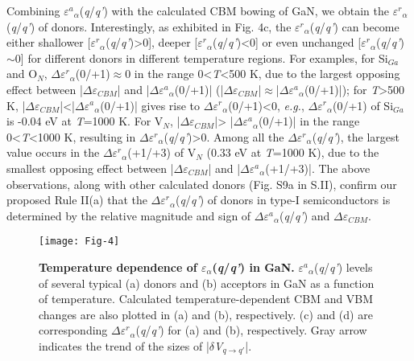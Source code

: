 \documentclass[onecolumn,preprint,superscriptaddress]{revtex4-1}
\begin{document}
Combining $\varepsilon$$^{a}$$_{\alpha}$(\emph{q}/\emph{q'}) with the calculated CBM bowing of GaN, we obtain the $\varepsilon$$^{r}$$_{\alpha}$(\emph{q}/\emph{q'}) of donors. Interestingly, as exhibited in Fig. 4c, the $\varepsilon$$^{r}$$_{\alpha}$(\emph{q}/\emph{q'}) can become either shallower [$\varepsilon$$^{r}$$_{\alpha}$(\emph{q}/\emph{q'})>0], deeper [$\varepsilon$$^{r}$$_{\alpha}$(\emph{q}/\emph{q'})<0] or even unchanged [$\varepsilon$$^{r}$$_{\alpha}$(\emph{q}/\emph{q'})$\sim$0] for different donors in different temperature regions. For examples, for Si$_{Ga}$ and O$_N$, $\Delta$$\varepsilon$$^{r}$$_{\alpha}$(0/+1)$\approx$0 in the range 0<\emph{T}<500 K, due to the largest opposing effect between |$\Delta$$\varepsilon$$_{CBM}$| and |$\Delta$$\varepsilon$$^{a}$$_{\alpha}$(0/+1)| (|$\Delta$$\varepsilon$$_{CBM}$|$\approx$|$\Delta$$\varepsilon$$^{a}$$_{\alpha}$(0/+1)|); for \emph{T}>500 K, |$\Delta$$\varepsilon$$_{CBM}$|<|$\Delta$$\varepsilon$$^{a}$$_{\alpha}$(0/+1)| gives rise to $\Delta$$\varepsilon$$^{r}$$_{\alpha}$(0/+1)<0, \emph{e.g.}, $\Delta$$\varepsilon$$^{r}$$_{\alpha}$(0/+1) of Si$_{Ga}$ is -0.04 eV at \emph{T}=1000 K. For V$_N$, |$\Delta$$\varepsilon$$_{CBM}$|> |$\Delta$$\varepsilon$$^{a}$$_{\alpha}$(0/+1)| in the range 0<\emph{T}<1000 K, resulting in $\Delta$$\varepsilon$$^{r}$$_{\alpha}$(\emph{q}/\emph{q'})>0. Among all the $\Delta$$\varepsilon$$^{r}$$_{\alpha}$(\emph{q}/\emph{q'}), the largest value occurs in the $\Delta$$\varepsilon$$^{r}$$_{\alpha}$(+1/+3) of V$_N$ (0.33 eV at \emph{T}=1000 K), due to the smallest opposing effect between |$\Delta$$\varepsilon$$_{CBM}$| and |$\Delta$$\varepsilon$$^{a}$$_{\alpha}$(+1/+3)|. The above observations, along with other calculated donors (Fig. S9a in S.II), confirm our proposed Rule II(a) that the $\Delta$$\varepsilon$$^{r}$$_{\alpha}$(\emph{q}/\emph{q'}) of donors in type-I semiconductors is determined by the relative magnitude and sign of $\Delta$$\varepsilon$$^{a}$$_{\alpha}$(\emph{q}/\emph{q'}) and $\Delta$$\varepsilon$$_{CBM}$.

\begin{figure}[htb!]
\texttt{[image: Fig-4]}
\caption{\label{fig:structure} \textbf{Temperature dependence of $\varepsilon$$_{\alpha}$(\emph{q}/\emph{q'}) in GaN.}
$\varepsilon$$^{a}$$_{\alpha}$(\emph{q}/\emph{q'}) levels of several typical (a) donors and (b) acceptors in GaN as a function of temperature. Calculated temperature-dependent CBM and VBM changes are also plotted in (a) and (b), respectively. (c) and (d) are corresponding $\Delta$$\varepsilon$$^{r}$$_{\alpha}$(\emph{q}/\emph{q'}) for (a) and (b), respectively. Gray arrow indicates the trend of the sizes of |$\delta$\emph{V}$_{q\rightarrow q'}$|.}
\label{4}
\end{figure}
\end{document}
